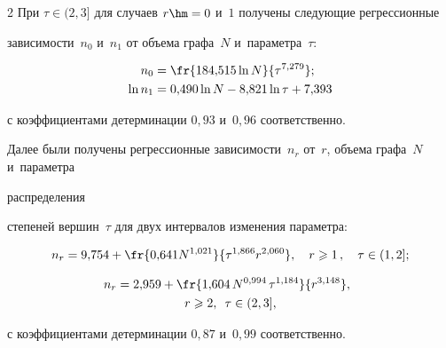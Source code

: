 \begin{multicols}{2}
При $\tau\in(2,3]$ для случаев $r\hm=0$ и~$1$ получены следующие регрессионные 


зависимости~$n_0$ и~$n_1$ от объема графа~$N$ и~параметра~$\tau$:


\begin{align*}


n_0 &= \fr{184{,}515\ln N}{\tau^{7{,}279}};


\\


\ln n_1& = 0{,}490\ln N - 8{,}821\ln\tau + 7{,}393


\end{align*}


с коэффициентами детерминации $0{,}93$ и~$0{,}96$ соответственно.





Далее были получены регрессионные зависимости~$n_r$ от~$r$, объема графа~$N$ и~параметра 


распределения


степеней вершин~$\tau$ для двух интервалов изменения параметра:


\begin{equation}


\label{eq7}


n_r = 9{,}754+\fr{0{,}641 N^{1{,}021}}{\tau^{1{,}866} r^{2{,}060}}, \quad r\geqslant 1\,, 


\quad \tau\in(1,2];


\end{equation}





\vspace*{-12pt}





\noindent


\begin{multline}


\label{eq8}


\hspace*{-1mm}n_r = 2{,}959+\fr{1{,}604\,N^{0,994}\,\tau^{1,184}}{r^{3,148}},\hspace*{1mm} \\


 r\geqslant 2,  \enskip \tau\in(2,3],


\end{multline}


с коэффициентами детерминации $0,87$ и~$0,99$ соответственно.



\end{multicols}
